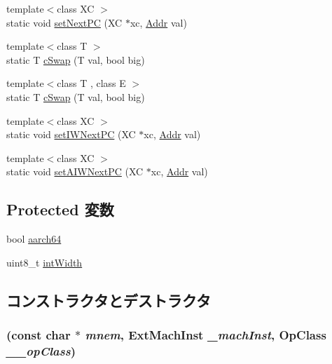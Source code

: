 \begin{DoxyCompactItemize}
\item 
{\footnotesize template$<$class XC $>$ }\\static void \hyperlink{classArmISA_1_1ArmStaticInst_a8a008e37d143524d0c3aba6e7c835f44}{setNextPC} (XC $\ast$xc, \hyperlink{classm5_1_1params_1_1Addr}{Addr} val)
\item 
{\footnotesize template$<$class T $>$ }\\static T \hyperlink{classArmISA_1_1ArmStaticInst_acf3e010f3f922cce3330ad7e69133c5f}{cSwap} (T val, bool big)
\item 
{\footnotesize template$<$class T , class E $>$ }\\static T \hyperlink{classArmISA_1_1ArmStaticInst_acf3e010f3f922cce3330ad7e69133c5f}{cSwap} (T val, bool big)
\item 
{\footnotesize template$<$class XC $>$ }\\static void \hyperlink{classArmISA_1_1ArmStaticInst_a7ef87b5f37a06b7143d275af2ab6444a}{setIWNextPC} (XC $\ast$xc, \hyperlink{classm5_1_1params_1_1Addr}{Addr} val)
\item 
{\footnotesize template$<$class XC $>$ }\\static void \hyperlink{classArmISA_1_1ArmStaticInst_a9345b4f7094d39b12eed323ddc30a6bf}{setAIWNextPC} (XC $\ast$xc, \hyperlink{classm5_1_1params_1_1Addr}{Addr} val)
\end{DoxyCompactItemize}
\subsection*{Protected 変数}
\begin{DoxyCompactItemize}
\item 
bool \hyperlink{classArmISA_1_1ArmStaticInst_a52c06c8a54293998f3e1f71cdbd916f7}{aarch64}
\item 
uint8\_\-t \hyperlink{classArmISA_1_1ArmStaticInst_a2a06976c0a3797444170f251f34bd40a}{intWidth}
\end{DoxyCompactItemize}


\subsection{コンストラクタとデストラクタ}
\hypertarget{classArmISA_1_1ArmStaticInst_a996483aaded98afb7f4306959a94f118}{
\subsubsection[{ArmStaticInst}]{ (const char $\ast$ {\em mnem}, \/  {\bf ExtMachInst} {\em \_\-machInst}, \/  OpClass {\em \_\-\_\-opClass})}}
\label{classArmISA_1_1ArmStaticInst_a996483aaded98afb7f4306959a94f118}



